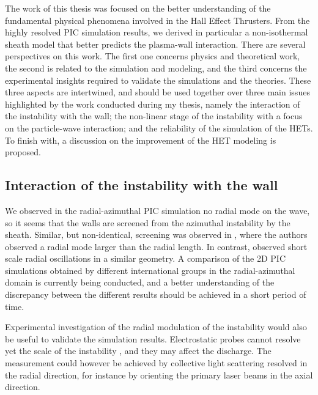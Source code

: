   The work of this thesis was focused on the better understanding of the fundamental physical phenomena involved in the Hall Effect Thrusters.
  From the highly resolved PIC simulation results, we derived in particular a non-isothermal sheath model that better predicts the plasma-wall interaction.
  There are several perspectives on this work.
  The first one concerns physics and theoretical work, the second is related to the simulation and modeling, and the third concerns the experimental insights required to validate the simulations and the theories.
  These three aspects are intertwined, and should be used together over three main issues highlighted by the work conducted during my thesis, namely the interaction of the instability with the wall\string; the non-linear stage of the instability with a focus on the particle-wave interaction\string; and the reliability of the simulation of the HETs.
  To finish with, a discussion on the improvement of the HET modeling is proposed.

  \subsection{Interaction of the instability with the wall}

    We observed in the radial-azimuthal PIC simulation no radial mode on the wave, so it seems that the walls are screened from the azimuthal instability by the sheath.
    Similar, but non-identical, screening was observed in \citet{janhunen2018}, where the authors observed a radial mode larger than the radial length.
    In contrast, \citet{taccogna2019} observed short scale radial oscillations in a similar geometry.
    A comparison of the 2D PIC simulations obtained by different international groups in the radial-azimuthal domain is currently being conducted, and a better understanding of the discrepancy between the different results should be achieved in a short period of time.

    Experimental investigation of the radial modulation of the instability would also be useful to validate the simulation results.
    Electrostatic probes cannot resolve yet the scale of the instability \citep{brown2018}, and they may affect the discharge.
    The measurement could however be achieved by collective light scattering \citep{tsikata2009} resolved in the radial direction, for instance by orienting the primary laser beams in the axial direction.

